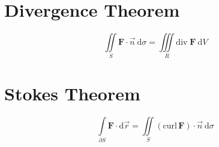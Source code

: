 \documentclass[12pt, fleqn]{book}
\newcommand{\D}{\mathrm{d}}
\newcommand{\iis}{\iint\limits_S}
\newcommand{\F}{\mathbf{F}}
\newcommand{\Curl}{\mathrm{curl}}
\newcommand{\Div}{\mathrm{div}}
\begin{document}
     	\section{Divergence Theorem}
     		\begin{equation}
     			\iis \F \cdot \vec{n} \ \D \sigma = \iiint\limits_R \Div \; \F \ \D V
     		\end{equation}
     	\section{Stokes Theorem}
     		\begin{equation}
     			\int\limits_{\partial S} \F \cdot \D \vec{r} = \iint\limits_S \left(\Curl \, \F\right) \cdot \vec{n} \ \D \sigma
     		\end{equation}
\end{document}
